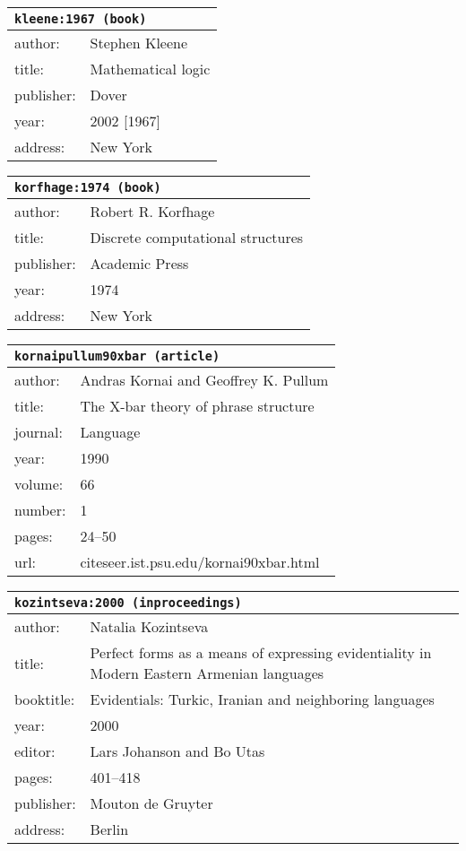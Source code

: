 \documentclass{article}
\begin{document}
\bigskip

\begin{tabular}{p{}p{}}
\multicolumn{2}{l}{\texttt{kleene:1967 (book)}}\\
\hline
author: & Stephen Kleene\\
title: & Mathematical logic\\
publisher: & Dover\\
year: & 2002 [1967]\\
address: & New York\\
\end{tabular}

\bigskip

\begin{tabular}{p{}p{}}
\multicolumn{2}{l}{\texttt{korfhage:1974 (book)}}\\
\hline
author: & Robert R. Korfhage\\
title: & Discrete computational structures\\
publisher: & Academic Press\\
year: & 1974\\
address: & New York\\
\end{tabular}

\bigskip

\begin{tabular}{p{}p{}}
\multicolumn{2}{l}{\texttt{kornaipullum90xbar (article)}}\\
\hline
author: & Andras Kornai and Geoffrey K. Pullum\\
title: & The X-bar theory of phrase structure\\
journal: & Language\\
year: & 1990\\
volume: & 66\\
number: & 1\\
pages: & 24--50\\
url: & citeseer.ist.psu.edu/kornai90xbar.html\\
\end{tabular}

\bigskip

\begin{tabular}{p{}p{}}
\multicolumn{2}{l}{\texttt{kozintseva:2000 (inproceedings)}}\\
\hline
author: & Natalia Kozintseva\\
title: & Perfect forms as a means of expressing evidentiality in Modern Eastern Armenian languages\\
booktitle: & Evidentials: Turkic, Iranian and neighboring languages\\
year: & 2000\\
editor: & Lars Johanson and Bo Utas\\
pages: & 401--418\\
publisher: & Mouton de Gruyter\\
address: & Berlin\\
\end{tabular}
\end{document}
